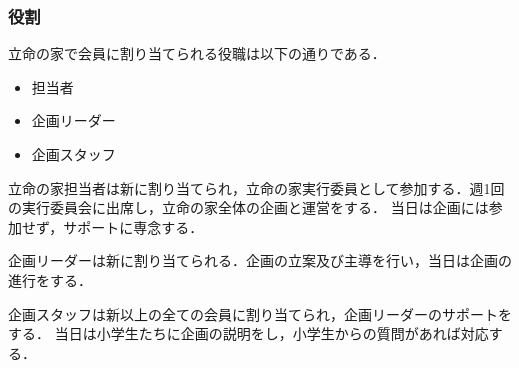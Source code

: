 \subsubsection*{役割}
立命の家で会員に割り当てられる役職は以下の通りである．
\begin{itemize}
  \item 担当者
  \item 企画リーダー
  \item 企画スタッフ
\end{itemize} 

立命の家担当者は新\secondGrade{}に割り当てられ，立命の家実行委員として参加する．週1回の実行委員会に出席し，立命の家全体の企画と運営をする．
当日は企画には参加せず，サポートに専念する．

企画リーダーは新\secondGrade{}に割り当てられる．企画の立案及び主導を行い，当日は企画の進行をする．

企画スタッフは新\firstGrade{}以上の全ての会員に割り当てられ，企画リーダーのサポートをする．
当日は小学生たちに企画の説明をし，小学生からの質問があれば対応する．
